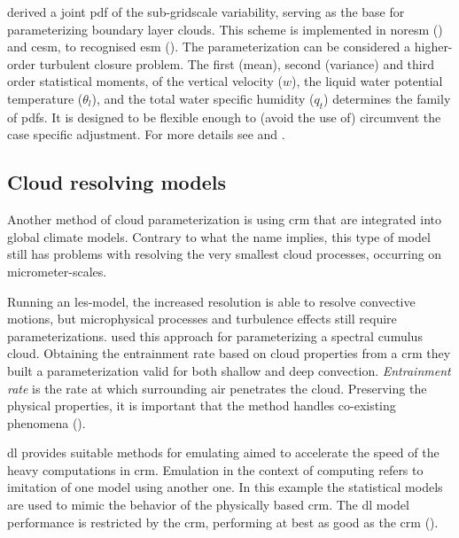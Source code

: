 \cite{Golaz2002_part1} derived a joint \acrshort{pdf} of the sub-gridscale variability, serving as the base for parameterizing boundary layer clouds. This scheme is implemented in \acrfull{noresm} (\cite{SelandNORESM}) and \acrfull{cesm}, to recognised \acrshort{esm} (\cite{DanabasogluCESM}).
The parameterization can be considered a higher-order turbulent closure problem. The first (mean), second (variance) and third order statistical moments, of the vertical velocity ($w$), the liquid water potential temperature ($\theta_l$), and the total water specific humidity ($q_t$) determines the family of \acrshort{pdf}s. It is designed to be flexible enough to (avoid the use of) circumvent the case specific adjustment. For more details see \cite{Golaz2002_part1} and \cite{Golaz2002_part2}.

\subsection{Cloud resolving models} \label{sec:params_climate_models}
Another method of cloud parameterization is using \acrfull{crm} that are integrated into global climate models. Contrary to what the name implies, this type of model still has problems with resolving the very smallest cloud processes, occurring on micrometer-scales. 

Running an \acrfull{les}-model, the increased resolution is able to resolve convective motions, but microphysical processes and turbulence effects still require parameterizations. \citeauthor{Baba2019SpectralModel} used this approach for parameterizing a spectral cumulus cloud. Obtaining the entrainment rate based on cloud properties from a \acrshort{crm} they built a parameterization valid for both shallow and deep convection. \textit{Entrainment rate} is the rate at which surrounding air penetrates the cloud. Preserving the physical properties, it is important that the method handles co-existing phenomena (\cite{Baba2019SpectralModel}). 

\acrshort{dl} provides suitable methods for emulating %
aimed to accelerate the speed of the heavy computations in \acrshort{crm}. Emulation in the context of computing refers to imitation of one model using another one. In this example the statistical models are used to mimic the behavior of the physically based \acrshort{crm}. The \acrshort{dl} model performance is restricted by the  \acrshort{crm}, performing at best as good as the \acrshort{crm} (\cite{Rasp2018DeepModels}).